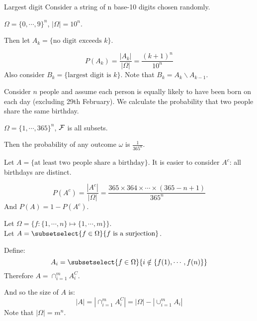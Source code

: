 \documentclass[../Main.tex]{subfiles}
\begin{document}
\begin{example}{Largest digit}
    Consider a string of n base-10 digits chosen randomly.\par
    $\Omega = \{0, \cdots, 9\}^n$, $|\Omega| = 10^n$.\par
    Then let $A_k=\{\text{no digit exceeds } k\}$.\par
    \begin{equation*}
        P(A_k) = \frac{|A_k|}{|\Omega|} = \frac{(k + 1)^n}{10^n}
    \end{equation*}
    Also consider $B_k = \{\text{largest digit is } k\}$. Note that $B_k = A_k \backslash A_{k - 1}$.
\end{example}
\begin{example}
    Consider $n$ people and assume each person is equally likely to have been born on each day (excluding 29th February). We calculate the probability that two people share the same birthday.\par
    $\Omega = \{1, \cdots, 365\}^n$, $\mathcal{F}$ is all subsets.\par
    Then the probability of any outcome $\omega$ is $\frac{1}{365^n}$.\par
    Let $A = \{\text{at least two people share a birthday}\}$. It is easier to consider $A^c$: all birthdays are distinct.\par
    \begin{equation*}
        P(A^c) = \frac{|A^c|}{|\Omega|} = \frac{365 \times 364 \times \cdots \times (365-n + 1)}{365^n}
    \end{equation*}
    And $P(A) = 1 - P(A^c)$.
\end{example}
\begin{example}
    Let $\Omega = \{f : \{1, \cdots, n\} \mapsto \{1, \cdots, m\}\}$. \\
    Let $A = \subsetselect{f \in \Omega}{f \text{ is a surjection}}$.\par
    Define:
    \begin{equation*}
        A_i = \subsetselect{f \in \Omega}{i \notin \{f(1), \cdots, f(n)\}}
    \end{equation*}
    Therefore $A = \cap_{i=1}^m A_i^C$.\par
    And so the size of $A$ is:
    \begin{equation*}
        |A| = \left|\cap_{i=1}^m A_i^C\right| = |\Omega| - \left|\cup_{i=1}^m A_i\right|
    \end{equation*}
    Note that $|\Omega| = m^n$.
\end{example}
\end{document}
